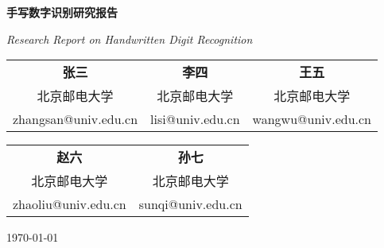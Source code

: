 
\begin{titlepage}
    \centering
    \vspace*{2.5cm}

    {\LARGE\bfseries 手写数字识别研究报告 \par}
    \vspace{0.8cm}
    {\large\itshape Research Report on Handwritten Digit Recognition \par}

    \vspace{2.5cm}

    \begin{center}
    \begin{tabular}{ccc}
        \textbf{张三} & \textbf{李四} & \textbf{王五} \\
        北京邮电大学 & 北京邮电大学 & 北京邮电大学 \\
        zhangsan@univ.edu.cn & lisi@univ.edu.cn & wangwu@univ.edu.cn \\
    \end{tabular}

    \vspace{1.2cm}

    \begin{tabular}{cc}
        \textbf{赵六} & \textbf{孙七} \\
        北京邮电大学 & 北京邮电大学 \\
        zhaoliu@univ.edu.cn & sunqi@univ.edu.cn \\
    \end{tabular}
    \end{center}

    \vfill

    {\normalsize\today\par}
\end{titlepage}